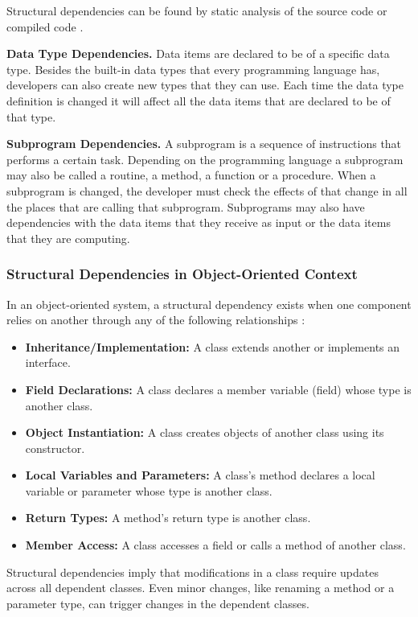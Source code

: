 Structural dependencies can be found by static analysis of the source code or compiled code \cite{Sangal:2005:UDM:1094811.1094824, sd-mining, CalloArias2011}. 

\textbf{Data Type Dependencies.}
Data items are declared to be of a specific data type. Besides the built-in data types that every programming language has, developers can also create new types that they can use. Each time the data type definition is changed it will affect all the data items that are declared to be of that type. 


\textbf{Subprogram Dependencies.}
A subprogram is a sequence of instructions that performs a certain task. Depending on the programming language a subprogram may also be called a routine, a method, a function or a procedure. When a subprogram is changed, the developer must check the effects of that change in all the places that are calling that subprogram. Subprograms may also have dependencies with the data items that they receive as input or the data items that they are computing.


\subsubsection{Structural Dependencies in Object-Oriented Context}

In an object-oriented system, a structural dependency exists when one component relies on another through any of the following relationships \cite{sd-Mirjana}:

\begin{itemize}
    \item \textbf{Inheritance/Implementation:} A class extends another or implements an interface.
    \item \textbf{Field Declarations:} A class declares a member variable (field) whose type is another class.
    \item \textbf{Object Instantiation:} A class creates objects of another class using its constructor.
    \item \textbf{Local Variables and Parameters:} A class’s method declares a local variable or parameter whose type is another class.
    \item \textbf{Return Types:} A method’s return type is another class.
    \item \textbf{Member Access:} A class accesses a field or calls a method of another class.
\end{itemize}

Structural dependencies imply that modifications in a class require updates across all dependent classes. Even minor changes, like renaming a method or a parameter type, can trigger changes in the dependent classes.


